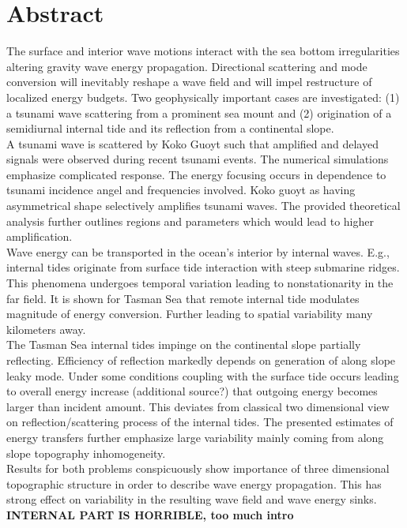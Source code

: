 \section*{Abstract}
The surface and interior wave motions interact with the sea bottom irregularities altering gravity wave energy propagation. Directional scattering and mode conversion will inevitably reshape a wave field and will impel restructure of localized energy budgets. Two geophysically important cases are investigated: (1) a tsunami wave scattering from a prominent sea mount and (2) origination of a semidiurnal internal tide and its reflection    from a continental slope.\\
A tsunami wave is scattered by Koko Guoyt such that amplified and delayed signals were observed during recent tsunami events. The numerical simulations emphasize complicated response. The energy focusing occurs in dependence to tsunami incidence angel and frequencies involved. Koko guoyt as having asymmetrical shape selectively amplifies tsunami waves. The provided theoretical analysis further outlines regions and parameters which would lead to higher amplification.\\
Wave energy can be transported in the ocean's interior by internal waves. E.g., internal tides originate from surface tide interaction with steep submarine ridges. This phenomena undergoes temporal variation leading to nonstationarity in the far field. It is shown for Tasman Sea that remote internal tide modulates magnitude of energy conversion. Further leading to spatial variability many kilometers away.\\
The Tasman Sea internal tides impinge on the continental slope partially reflecting. Efficiency of reflection markedly depends on generation of along slope leaky mode. Under some conditions coupling with the surface tide occurs leading to overall energy increase (additional source?) that outgoing energy becomes larger than incident amount. This deviates from classical two dimensional view on reflection/scattering process of the internal tides. The presented estimates of energy transfers further emphasize large variability mainly coming from along slope topography inhomogeneity.\\
Results for both problems conspicuously show importance of three dimensional topographic structure in order to describe wave energy propagation. This has strong effect on variability in the resulting wave field and wave energy sinks.\\
\textbf{INTERNAL PART IS HORRIBLE, too much intro}

